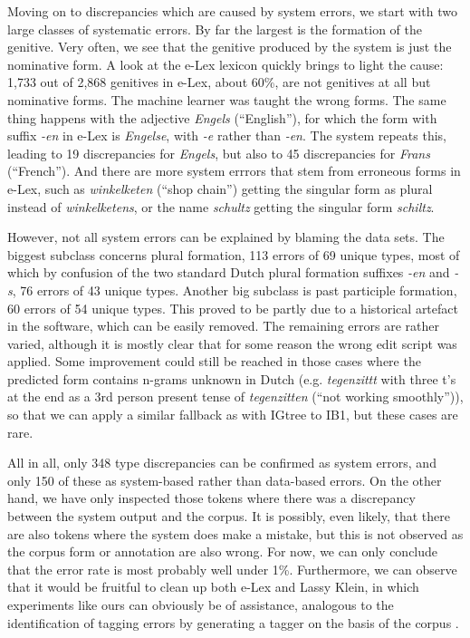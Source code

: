 \documentclass[a4paper,10pt,twoside]{article}
\begin{document}
Moving on to discrepancies which are caused by system errors, we start with two large classes of systematic errors. By far the largest is the formation of the genitive. Very often, we see that the genitive produced by the system is just the nominative form. A look at the e-Lex lexicon quickly brings to light the cause: 1,733 out of 2,868 genitives in e-Lex, about 60\%, are not genitives at all but nominative forms. The machine learner was taught the wrong forms. The same thing happens with the adjective \textit{Engels} (``English''), for which the form with suffix \textit{-en} in e-Lex is \textit{Engelse}, with \textit{-e} rather than \textit{-en}. The system repeats this, leading to 19 discrepancies for \textit{Engels}, but also to 45 discrepancies for \textit{Frans} (``French''). And there are more system errrors that stem from erroneous forms in e-Lex, such as \textit{winkelketen} (``shop chain'') getting the singular form as plural instead of \textit{winkelketens}, or the name \textit{schultz} getting the singular form \textit{schiltz}. 

However, not all system errors can be explained by blaming the data sets. The biggest subclass concerns plural formation, 113 errors of 69 unique types, most of which by confusion of the two standard Dutch plural formation suffixes \textit{-en} and \textit{-s}, 76 errors of 43 unique types. Another big subclass is past participle formation, 60 errors of 54 unique types. This proved to be partly due to a historical artefact in the software, which can be easily removed. The remaining errors are rather varied, although it is mostly clear that for some reason the wrong edit script was applied. Some improvement could still be reached in those cases where the predicted form contains n-grams unknown in Dutch (e.g. \textit{tegenzittt} with three t's at the end as a 3rd person present tense of \textit{tegenzitten} (``not working smoothly'')), so that we can apply a similar fallback as with IGtree to IB1, but these cases are rare.


All in all, only 348 type discrepancies can be confirmed as system errors, and only 150 of these as system-based rather than data-based errors. On the other hand, we have only inspected those tokens where there was a discrepancy between the system output and the corpus. It is possibly, even likely, that there are also tokens where the system does make a mistake, but this is not observed as the corpus form or annotation are also wrong. For now, we can only conclude that the error rate is most probably well under 1\%. Furthermore, we can observe that it would be fruitful to clean up both e-Lex and Lassy Klein, in which experiments like ours can obviously be of assistance, analogous to the identification of tagging errors by generating a tagger on the basis of the corpus \cite{REFlinc}. 
\end{document}
